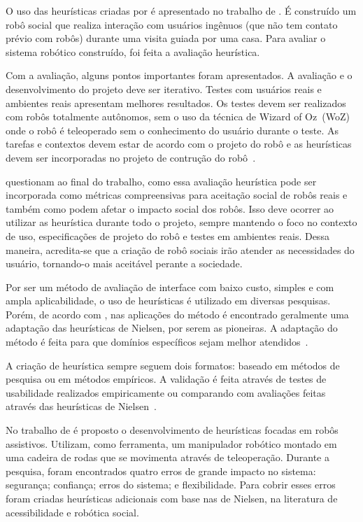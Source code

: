 O uso das heurísticas criadas por \textcite{clarkson:2007} é apresentado no trabalho de \textcite{lohse:2008}. É construído um robô social que realiza interação com usuários ingênuos (que não tem contato prévio com robôs) durante uma visita guiada por uma casa. Para avaliar o sistema robótico construído, foi feita a avaliação heurística.

Com a avaliação, alguns pontos importantes foram apresentados. A avaliação e o desenvolvimento do projeto deve ser iterativo. Testes com usuários reais e ambientes reais apresentam melhores resultados. Os testes devem ser realizados com robôs totalmente autônomos, sem o uso da técnica de Wizard of Oz~(WoZ) onde o robô é teleoperado sem o conhecimento do usuário durante o teste. As tarefas e contextos devem estar de acordo com o projeto do robô e as heurísticas devem ser incorporadas no projeto de contrução do robô~\cite{lohse:2008}.

\textcite{lohse:2008} questionam ao final do trabalho, como essa avaliação heurística pode ser incorporada como métricas compreensivas para aceitação social de robôs reais e também como podem afetar o impacto social dos robôs. Isso deve ocorrer ao utilizar as heurística durante todo o projeto, sempre mantendo o foco no contexto de uso, especificações de projeto do robô e testes em ambientes reais. Dessa maneira, acredita-se que a criação de robô sociais irão atender as necessidades do usuário, tornando-o mais aceitável perante a sociedade.

Por ser um método de avaliação de interface com baixo custo, simples e com ampla aplicabilidade, o uso de heurísticas é utilizado em diversas pesquisas. Porém, de acordo com \textcite{tsui:2010}, nas aplicações do método é encontrado geralmente uma adaptação das heurísticas de Nielsen, por serem as pioneiras. A adaptação do método é feita para que domínios específicos sejam melhor atendidos~\cite{tsui:2010}.

A criação de heurística sempre seguem dois formatos: baseado em métodos de pesquisa ou em métodos empíricos. A validação é feita através de testes de usabilidade realizados empiricamente ou comparando com avaliações feitas através das heurísticas de Nielsen~\cite{tsui:2010}.

No trabalho de \textcite{tsui:2010} é proposto o desenvolvimento de heurísticas focadas em robôs assistivos. Utilizam, como ferramenta, um manipulador robótico montado em uma cadeira de rodas que se movimenta através de teleoperação. Durante a pesquisa, foram encontrados quatro erros de grande impacto no sistema: segurança; confiança; erros do sistema; e flexibilidade. Para cobrir esses erros foram criadas heurísticas adicionais com base nas de Nielsen, na literatura de acessibilidade e robótica social.

